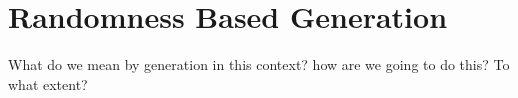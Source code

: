 \section{Randomness Based Generation}

What do we mean by generation in this context? how are we going to do this? To 
what extent?
